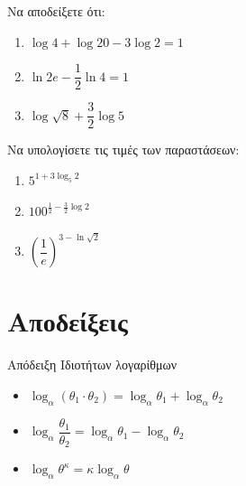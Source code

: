 \documentclass{presentation}
\begin{document}
\begin{askisi}
  Να αποδείξετε ότι:
  \begin{enumerate}
    \item<1-> $\log 4+\log 20-3\log 2=1$
    \item<2-> $\ln 2e-\dfrac{1}{2}\ln 4=1$
    \item<3-> $\log\sqrt{8}+\dfrac{3}{2}\log 5$
  \end{enumerate}


\end{askisi}

\begin{askisi}
  Να υπολογίσετε τις τιμές των παραστάσεων:
  \begin{enumerate}
    \item<1-> $5^{1+3\log_5 2}$
    \item<2-> $100^{\frac{1}{2}-\frac{3}{2}\log 2}$
    \item<3-> $\left( \dfrac{1}{e} \right)^{3-\ln \sqrt{2}} $
  \end{enumerate}


\end{askisi}

\appendix

\section{Αποδείξεις}
\begin{frame}[label=Απόδειξη1,t]{Απόδειξη Ιδιοτήτων λογαρίθμων}

  \begin{itemize}
    \item<1-> $\log_α\left( θ_1\cdot θ_2 \right)=\log_αθ_1+\log_αθ_2 $
    \item<3-> $\log_α\dfrac{θ_1}{θ_2}=\log_αθ_1-\log_αθ_2 $
    \item<4-> $\log_αθ^κ=κ\log_αθ$
  \end{itemize}



  \hyperlink{Ιδιότητες}{}
\end{frame}
\end{document}
